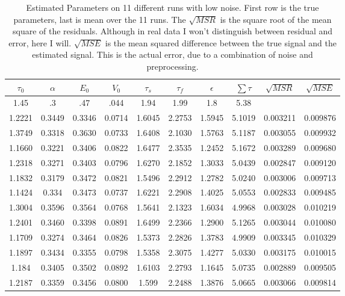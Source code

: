 \begin{table}[t]
\centering
\begin{tabular}{|c | c | c | c | c | c | c | c | c | c |}
\hline 
$\tau_0$ & $\alpha$ & $E_0$    & $V_0$    & $\tau_s$ & $\tau_f$ & $\epsilon$  & $ \sum \tau $ & $\sqrt{MSR}$ &$\sqrt{MSE}$\\
\hline 
\rowcolor[gray]{.8}
1.45 & .3 & .47 & .044 & 1.94 & 1.99 & 1.8  & 5.38 &  & \\
\hline 
\hline 
1.2221 & 0.3449 & 0.3346 & 0.0714 & 1.6045 & 2.2753 & 1.5945 & 5.1019 &  0.003211  & 0.009876  \\
1.3749 & 0.3318 & 0.3630 & 0.0733 & 1.6408 & 2.1030 & 1.5763 & 5.1187 &  0.003055  & 0.009932  \\
1.1660 & 0.3221 & 0.3406 & 0.0822 & 1.6477 & 2.3535 & 1.2452 & 5.1672 &  0.003289  & 0.009680  \\
1.2318 & 0.3271 & 0.3403 & 0.0796 & 1.6270 & 2.1852 & 1.3033 & 5.0439 &  0.002847  & 0.009120  \\
1.1832 & 0.3179 & 0.3472 & 0.0821 & 1.5496 & 2.2912 & 1.2782 & 5.0240 &  0.003006  & 0.009713  \\
1.1424 & 0.334  & 0.3473 & 0.0737 & 1.6221 & 2.2908 & 1.4025 & 5.0553 &  0.002833  & 0.009485  \\
1.3004 & 0.3596 & 0.3564 & 0.0768 & 1.5641 & 2.1323 & 1.6034 & 4.9968 &  0.003028  & 0.010219  \\
1.2401 & 0.3460 & 0.3398 & 0.0891 & 1.6499 & 2.2366 & 1.2900 & 5.1265 &  0.003044  & 0.010080  \\
1.1709 & 0.3274 & 0.3464 & 0.0826 & 1.5373 & 2.2826 & 1.3783 & 4.9909 &  0.003345  & 0.010329  \\
1.1897 & 0.3434 & 0.3355 & 0.0798 & 1.5358 & 2.3075 & 1.4277 & 5.0330 &  0.003175  & 0.010015  \\
1.184 &  0.3405 & 0.3502 & 0.0892 & 1.6103 & 2.2793 & 1.1645 & 5.0735 &  0.002889  & 0.009505  \\
\hline                                                                           
1.2187 & 0.3359 & 0.3456 & 0.0800 & 1.599 & 2.2488 & 1.3876 & 5.0665 & 0.003066     & 0.009814 \\
\hline 
\end{tabular}
\caption{Estimated Parameters on 11 different runs with low noise. First row is the true parameters,
last is mean over the 11 runs. The $\sqrt{MSR}$ is the square root of the mean square of the
residuals. Although in real data I won't distinguish between residual and error, here I will.
$\sqrt{MSE}$ is the mean squared difference between the true signal and the estimated signal.
This is the actual error, due to a combination of noise and preprocessing. }
\label{tab:LowNoiseResults} 
\end{table}


